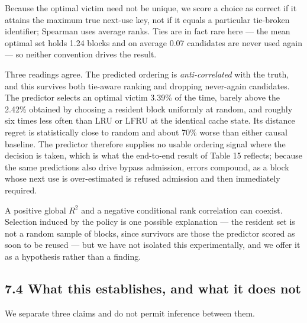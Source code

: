 \documentclass[
  10pt,
  letterpaper,
  10pt]{article}
\begin{document}
Because the optimal victim need not be unique, we score a choice as
correct if it attains the maximum true next-use key, not if it equals a
particular tie-broken identifier; Spearman uses average ranks. Ties are
in fact rare here --- the mean optimal set holds 1.24 blocks and on
average 0.07 candidates are never used again --- so neither convention
drives the result.

Three readings agree. The predicted ordering is \emph{anti-correlated}
with the truth, and this survives both tie-aware ranking and dropping
never-again candidates. The predictor selects an optimal victim 3.39\%
of the time, barely above the 2.42\% obtained by choosing a resident
block uniformly at random, and roughly six times less often than LRU or
LFRU at the identical cache state. Its distance regret is statistically
close to random and about 70\% worse than either causal baseline. The
predictor therefore supplies no usable ordering signal where the
decision is taken, which is what the end-to-end result of Table 15
reflects; because the same predictions also drive bypass admission,
errors compound, as a block whose next use is over-estimated is refused
admission and then immediately required.

A positive global \(R^2\) and a negative conditional rank correlation
can coexist. Selection induced by the policy is one possible explanation
--- the resident set is not a random sample of blocks, since survivors
are those the predictor scored as soon to be reused --- but we have not
isolated this experimentally, and we offer it as a hypothesis rather
than a finding.

\subsection{7.4 What this establishes, and what it does
not}\label{what-this-establishes-and-what-it-does-not}

We separate three claims and do not permit inference between them.
\end{document}
